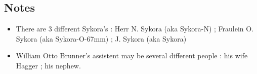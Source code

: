 \documentclass[12pt]{article}
\begin{document}
\subsection{Notes}
\begin{itemize}
    \item There are 3 different Sykora's : Herr N. Sykora (aka Sykora-N) ; Fraulein O. Sykora (aka Sykora-O-67mm) ; J. Sykora (aka Sykora)\label{section:info sykora}
    \item William Otto Brunner's assistent may be several different people : his wife Hagger ; his nephew.
\end{itemize}
\end{document}
